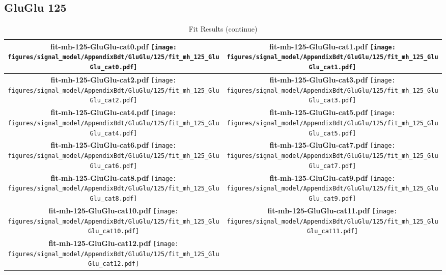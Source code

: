 \subsection{GluGlu 125}
\begin{longtable}{|c|c|}
\caption{Fit Results}
\endfirsthead
\caption{Fit Results (continue)}
\endhead
\hline
\parbox{0.47\textwidth}{
\centering
{\bfseries fit-mh-125-GluGlu-cat0.pdf}
\texttt{[image: figures/signal\_model/AppendixBdt/GluGlu/125/fit\_mh\_125\_GluGlu\_cat0.pdf]}
}
 & \parbox{0.47\textwidth}{
\centering
{\bfseries fit-mh-125-GluGlu-cat1.pdf}
\texttt{[image: figures/signal\_model/AppendixBdt/GluGlu/125/fit\_mh\_125\_GluGlu\_cat1.pdf]}
}
 \\
\hline
\parbox{0.47\textwidth}{
\centering
{\bfseries fit-mh-125-GluGlu-cat2.pdf}
\texttt{[image: figures/signal\_model/AppendixBdt/GluGlu/125/fit\_mh\_125\_GluGlu\_cat2.pdf]}
}
 & \parbox{0.47\textwidth}{
\centering
{\bfseries fit-mh-125-GluGlu-cat3.pdf}
\texttt{[image: figures/signal\_model/AppendixBdt/GluGlu/125/fit\_mh\_125\_GluGlu\_cat3.pdf]}
}
 \\
\hline
\parbox{0.47\textwidth}{
\centering
{\bfseries fit-mh-125-GluGlu-cat4.pdf}
\texttt{[image: figures/signal\_model/AppendixBdt/GluGlu/125/fit\_mh\_125\_GluGlu\_cat4.pdf]}
}
 & \parbox{0.47\textwidth}{
\centering
{\bfseries fit-mh-125-GluGlu-cat5.pdf}
\texttt{[image: figures/signal\_model/AppendixBdt/GluGlu/125/fit\_mh\_125\_GluGlu\_cat5.pdf]}
}
 \\
\hline
\parbox{0.47\textwidth}{
\centering
{\bfseries fit-mh-125-GluGlu-cat6.pdf}
\texttt{[image: figures/signal\_model/AppendixBdt/GluGlu/125/fit\_mh\_125\_GluGlu\_cat6.pdf]}
}
 & \parbox{0.47\textwidth}{
\centering
{\bfseries fit-mh-125-GluGlu-cat7.pdf}
\texttt{[image: figures/signal\_model/AppendixBdt/GluGlu/125/fit\_mh\_125\_GluGlu\_cat7.pdf]}
}
 \\
\hline
\parbox{0.47\textwidth}{
\centering
{\bfseries fit-mh-125-GluGlu-cat8.pdf}
\texttt{[image: figures/signal\_model/AppendixBdt/GluGlu/125/fit\_mh\_125\_GluGlu\_cat8.pdf]}
}
 & \parbox{0.47\textwidth}{
\centering
{\bfseries fit-mh-125-GluGlu-cat9.pdf}
\texttt{[image: figures/signal\_model/AppendixBdt/GluGlu/125/fit\_mh\_125\_GluGlu\_cat9.pdf]}
}
 \\
\hline
\parbox{0.47\textwidth}{
\centering
{\bfseries fit-mh-125-GluGlu-cat10.pdf}
\texttt{[image: figures/signal\_model/AppendixBdt/GluGlu/125/fit\_mh\_125\_GluGlu\_cat10.pdf]}
}
 & \parbox{0.47\textwidth}{
\centering
{\bfseries fit-mh-125-GluGlu-cat11.pdf}
\texttt{[image: figures/signal\_model/AppendixBdt/GluGlu/125/fit\_mh\_125\_GluGlu\_cat11.pdf]}
}
 \\
\hline
\parbox{0.47\textwidth}{
\centering
{\bfseries fit-mh-125-GluGlu-cat12.pdf}
\texttt{[image: figures/signal\_model/AppendixBdt/GluGlu/125/fit\_mh\_125\_GluGlu\_cat12.pdf]}
}
 & \\ \hline
\end{longtable}

